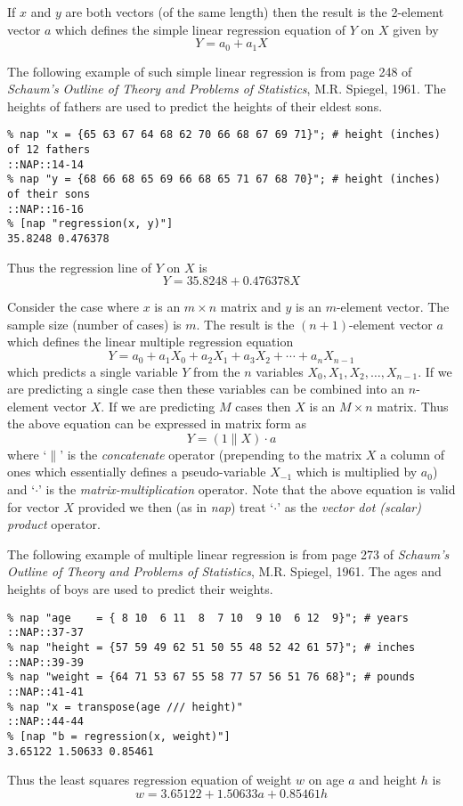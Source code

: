 If $x$ and $y$ are both vectors (of the same length) then the
result is the 2-element vector $a$ which defines the simple linear regression equation
of $Y$ on $X$ given by
\[ Y = a_0 + a_1 X \]

The following example of such simple linear regression is from page 248 of 
\emph{Schaum's Outline of Theory and Problems of Statistics}, M.R. Spiegel, 1961.
The heights of fathers are used to predict the heights of their eldest sons.
\begin{verbatim}
% nap "x = {65 63 67 64 68 62 70 66 68 67 69 71}"; # height (inches) of 12 fathers
::NAP::14-14
% nap "y = {68 66 68 65 69 66 68 65 71 67 68 70}"; # height (inches) of their sons
::NAP::16-16
% [nap "regression(x, y)"]
35.8248 0.476378
\end{verbatim}
Thus the regression line of $Y$ on $X$ is
\[ Y = 35.8248 + 0.476378 X \]

Consider the case where $x$ is an $m \times n$ matrix and $y$ is an $m$-element vector.
The sample size (number of cases) is $m$.
The result is the $(n+1)$-element vector $a$ which defines
the linear multiple regression equation 
\[ Y = a_0 + a_1 X_0 + a_2 X_1 + a_3 X_2 + \cdots + a_n X_{n-1} \]
which predicts a single variable $Y$ from the $n$ variables 
$X_0, X_1, X_2, \ldots , X_{n-1}$.
If we are predicting a single case then these variables can be combined into an
$n$-element vector $X$.
If we are predicting $M$ cases then $X$ is an $M \times n$ matrix.
Thus the above equation can be expressed in matrix form as
\[ Y = (1 \| X) \cdot a \]
where `$\|$' is the \emph{concatenate} operator 
(prepending to the matrix $X$ a column of ones 
which essentially defines a pseudo-variable $X_{-1}$ which is multiplied by $a_0$)
and `$\cdot$' is the \emph{matrix-multiplication} operator.
Note that the above equation is valid for vector $X$ provided we then (as in \emph{nap})
treat `$\cdot$' as the \emph{vector dot (scalar) product} operator.

The following example of multiple linear regression is from page 273 of 
\emph{Schaum's Outline of Theory and Problems of Statistics}, M.R. Spiegel, 1961.
The ages and heights of boys are used to predict their weights.
\begin{verbatim}
% nap "age    = { 8 10  6 11  8  7 10  9 10  6 12  9}"; # years
::NAP::37-37
% nap "height = {57 59 49 62 51 50 55 48 52 42 61 57}"; # inches
::NAP::39-39
% nap "weight = {64 71 53 67 55 58 77 57 56 51 76 68}"; # pounds
::NAP::41-41
% nap "x = transpose(age /// height)"
::NAP::44-44
% [nap "b = regression(x, weight)"]
3.65122 1.50633 0.85461
\end{verbatim}
Thus the least squares regression equation of weight $w$ on age $a$ and height $h$ is
\[ w = 3.65122 + 1.50633 a + 0.85461 h \]

